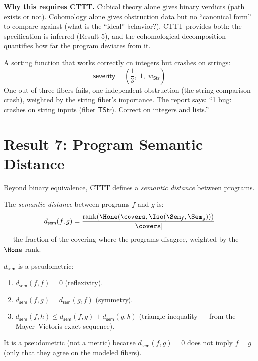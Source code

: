 \textbf{Why this requires CTTT.}
Cubical theory alone gives binary verdicts (path exists or not).
Cohomology alone gives obstruction data but no ``canonical form''
to compare against (what is the ``ideal'' behavior?).
CTTT provides both: the specification is inferred (Result 5),
and the cohomological decomposition quantifies how far the program
deviates from it.

\begin{example}
A sorting function that works correctly on integers but crashes on
strings:
\[
  \mathsf{severity} = \left(\frac{1}{3},\; 1,\;
    w_\mathsf{Str}\right)
\]
One out of three fibers fails, one independent obstruction (the
string-comparison crash), weighted by the string fiber's importance.
The report says: ``1 bug: crashes on string inputs (fiber
$\mathsf{TStr}$). Correct on integers and lists.''
\end{example}

\section{Result 7: Program Semantic Distance}

Beyond binary equivalence, CTTT defines a \emph{semantic distance}
between programs.

\begin{definition}
\label{def:sem-distance}
The \emph{semantic distance} between programs $f$ and $g$ is:
\[
  d_\mathsf{sem}(f, g) = \frac{\mathrm{rank}(\Hone(\covers,
    \Iso(\Sem_f, \Sem_g)))}{|\covers|}
\]
--- the fraction of the covering where the programs disagree,
weighted by the $\Hone$ rank.
\end{definition}

\begin{proposition}
$d_\mathsf{sem}$ is a pseudometric:
\begin{enumerate}
  \item $d_\mathsf{sem}(f, f) = 0$ (reflexivity).
  \item $d_\mathsf{sem}(f, g) = d_\mathsf{sem}(g, f)$ (symmetry).
  \item $d_\mathsf{sem}(f, h) \leq d_\mathsf{sem}(f, g) +
    d_\mathsf{sem}(g, h)$ (triangle inequality --- from the
    Mayer--Vietoris exact sequence).
\end{enumerate}
It is a pseudometric (not a metric) because $d_\mathsf{sem}(f, g) = 0$
does not imply $f = g$ (only that they agree on the modeled fibers).
\end{proposition}

